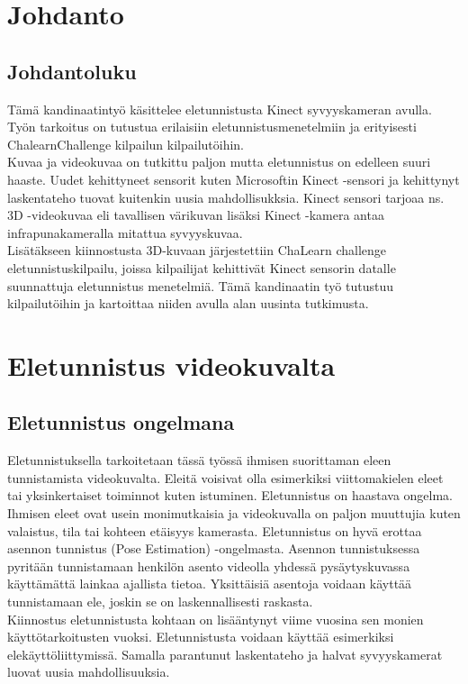 
\section{Johdanto}



\subsection{Johdantoluku}

Tämä kandinaatintyö käsittelee eletunnistusta Kinect syvyyskameran avulla. 
Työn tarkoitus on tutustua erilaisiin eletunnistusmenetelmiin ja erityisesti ChalearnChallenge kilpailun kilpailutöihin. 
\\
Kuvaa ja videokuvaa on tutkittu paljon mutta eletunnistus on edelleen suuri haaste. Uudet kehittyneet
sensorit kuten Microsoftin Kinect -sensori ja kehittynyt laskentateho tuovat kuitenkin uusia mahdollisukksia. 
Kinect sensori tarjoaa ns. 3D -videokuvaa eli tavallisen värikuvan lisäksi Kinect -kamera antaa infrapunakameralla mitattua syvyyskuvaa.\\

Lisätäkseen kiinnostusta 3D-kuvaan järjestettiin ChaLearn challenge eletunnistuskilpailu, joissa kilpailijat kehittivät Kinect sensorin datalle suunnattuja 
eletunnistus menetelmiä. Tämä kandinaatin työ tutustuu kilpailutöihin ja kartoittaa niiden avulla alan uusinta tutkimusta.\\



\section{Eletunnistus videokuvalta}
\label{Eletunnistus videokuvalta}


\subsection{Eletunnistus ongelmana}
Eletunnistuksella tarkoitetaan tässä työssä ihmisen suorittaman eleen tunnistamista videokuvalta. Eleitä voisivat olla esimerkiksi
viittomakielen eleet tai yksinkertaiset toiminnot kuten istuminen. Eletunnistus on haastava ongelma. Ihmisen eleet ovat usein 
monimutkaisia ja videokuvalla on paljon muuttujia kuten valaistus, tila tai kohteen etäisyys kamerasta.\citep {1251144} Eletunnistus on hyvä erottaa
asennon tunnistus (Pose Estimation) -ongelmasta. Asennon tunnistuksessa pyritään tunnistamaan henkilön asento videolla yhdessä pysäytyskuvassa
käyttämättä lainkaa ajallista tietoa. \citep {hirsjarvilol2009} Yksittäisiä asentoja voidaan käyttää tunnistamaan ele, joskin se on laskennallisesti raskasta.\\
Kiinnostus eletunnistusta kohtaan on lisääntynyt viime vuosina sen monien käyttötarkoitusten vuoksi. Eletunnistusta voidaan käyttää esimerkiksi elekäyttöliittymissä.
\citep {1251144} Samalla parantunut laskentateho ja halvat syvyyskamerat luovat uusia mahdollisuuksia.\citep {6239178}\\

